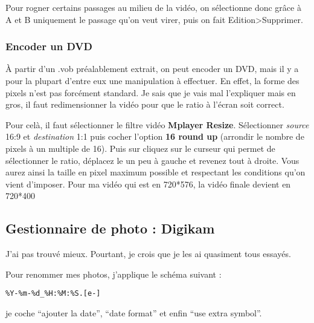\documentclass[a4paper,twoside]{article}
\begin{document}
Pour rogner certains passages au milieu de la vidéo, on sélectionne donc grâce à A et B uniquement le passage qu'on veut virer, puis on fait Edition>Supprimer.

\subsubsection{Encoder un DVD}\label{sec:encoder_DVD}
À partir d'un .vob préalablement extrait, on peut encoder un DVD, mais il y a pour la plupart d'entre eux une manipulation à effectuer. En effet, la forme des pixels n'est pas forcément standard. Je sais que je vais mal l'expliquer mais en gros, il faut redimensionner la vidéo pour que le ratio à l'écran soit correct.

Pour celà, il faut sélectionner le filtre vidéo \textbf{Mplayer Resize}. Sélectionner \emph{source} 16:9 et \emph{destination} 1:1 puis cocher l'option \textbf{16 round up} (arrondir le nombre de pixels à un multiple de 16). Puis sur cliquez sur le curseur qui permet de sélectionner le ratio, déplacez le un peu à gauche et revenez tout à droite. Vous aurez ainsi la taille en pixel maximum possible et respectant les conditions qu'on vient d'imposer. Pour ma vidéo qui est en 720*576, la vidéo finale devient en 720*400



\subsection{Gestionnaire de photo : Digikam}
J'ai pas trouvé mieux. Pourtant, je crois que je les ai quasiment tous essayés.

Pour renommer mes photos, j'applique le schéma suivant :
\begin{verbatim}
%Y-%m-%d_%H:%M:%S.[e-]
\end{verbatim}
je coche ``ajouter la date'', ``date format'' et enfin ``use extra symbol''.
\end{document}
